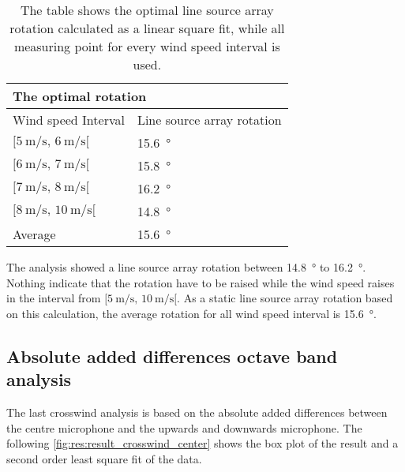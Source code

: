  
 \begin{table}[H]
 \centering
 \caption{The table shows the optimal line source array rotation calculated as a linear square fit, while all measuring point for every wind speed interval is used.}
\begin{tabular}{l|l}
\multicolumn{2}{l}{The optimal rotation}      \\ \hline
Wind speed Interval & Line source array rotation \\ \hline
  $[\SI{5}{\meter\per\second},\, \SI{6}{\meter\per\second}[ $       &   \SI{15.6}{\degree}    \\
   $[\SI{6}{\meter\per\second},\, \SI{7}{\meter\per\second}[ $     &   \SI{15.8}{\degree}     \\
  $[\SI{7}{\meter\per\second},\, \SI{8}{\meter\per\second}[ $       &    \SI{16.2}{\degree}    \\
   $[\SI{8}{\meter\per\second},\, \SI{10}{\meter\per\second}[ $      &     \SI{14.8}{\degree}  \\ \hline
    Average      &     \SI{15.6}{\degree} 
\end{tabular}
\label{res:tab:cross_mean_all}
\end{table}     

The analysis showed a line source array rotation between \SI{14.8}{\degree} to  \SI{16.2}{\degree}. Nothing indicate that the rotation have to be raised while the wind speed raises in the interval from $[\SI{5}{\meter\per\second},\, \SI{10}{\meter\per\second}[ $. As a static line source array rotation based on this calculation, the average rotation for all wind speed interval is \SI{15.6}{\degree}.



\subsection{Absolute added differences octave band analysis}\label{res:ana:abs}
The last crosswind analysis is based on the absolute added differences between the centre microphone and the upwards and downwards microphone. The following \autoref{fig:res:result_crosswind_center} shows the box plot of the result and a second order least square fit of the data. 
 

